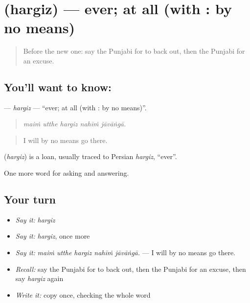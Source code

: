 \section[\texorpdfstring{\pa{ਹਰਗਿਜ਼} (hargiz)}{ਹਰਗਿਜ਼ (hargiz)}]{ (hargiz) — ever; at all (with : by no means)}

\label{lesson:PA-C339-hargiz}



\begin{quote}
Before the new one: say the Punjabi for to back out, then the Punjabi for an excuse.
\end{quote}

\subsection*{You'll want to know: }
\textbf{} — \emph{hargiz} — \textquotedblleft{}ever; at all (with : by no means)\textquotedblright{}.

\begin{quote}
    
\end{quote}

\begin{quote}
\emph{maiṁ utthe hargiz nahīṁ jāvāṅgā.}
\end{quote}

\begin{quote}
I will by no means go there.
\end{quote}

\begin{cousinweb}
\textbf{} (\emph{hargiz}) is a loan, usually traced to Persian \emph{hargiz}, \textquotedblleft{}ever\textquotedblright{}.
\end{cousinweb}

\begin{grammarlens}[title={What you've built}]
One more word for asking and answering.
\end{grammarlens}

\subsection*{Your turn}
\begin{itemize}
\raggedright
  \item \emph{Say it:} \emph{hargiz}
  \item \emph{Say it:} \emph{hargiz}, once more
  \item \emph{Say it:} \emph{maiṁ utthe hargiz nahīṁ jāvāṅgā.} — I will by no means go there.
  \item \emph{Recall:} say the Punjabi for to back out, then the Punjabi for an excuse, then say \emph{hargiz} again
  \item \emph{Write it:} copy \textbf{} once, checking the whole word
\end{itemize}

